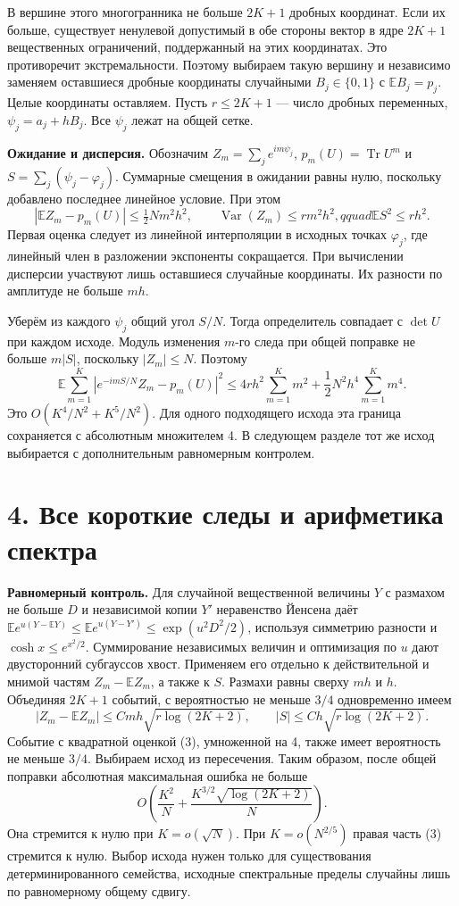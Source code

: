 \documentclass[11pt,a4paper]{article}
\newcommand{\Tr}{\operatorname{Tr}}
\newcommand{\EE}{\mathbb E}
\newcommand{\sect}[1]{\section*{\sffamily\color{ink}#1}}
\newcommand{\subt}[1]{\par\medskip\noindent\textbf{#1.}\quad}
\begin{document}
В вершине этого многогранника не больше \(2K+1\) дробных координат. Если их больше, существует ненулевой допустимый в обе стороны вектор в ядре \(2K+1\) вещественных ограничений, поддержанный на этих координатах. Это противоречит экстремальности. Поэтому выбираем такую вершину и независимо заменяем оставшиеся дробные координаты случайными \(B_j\in\{0,1\}\) с \(\EE B_j=p_j\). Целые координаты оставляем. Пусть \(r\le2K+1\) --- число дробных переменных, \(\psi_j=a_j+hB_j\). Все \(\psi_j\) лежат на общей сетке.

\subt{Ожидание и дисперсия}
Обозначим \(Z_m=\sum_j e^{im\psi_j}\), \(p_m(U)=\Tr U^m\) и \(S=\sum_j(\psi_j-\varphi_j)\). Суммарные смещения в ожидании равны нулю, поскольку добавлено последнее линейное условие. При этом
\[
  |\EE Z_m-p_m(U)|\le\tfrac12 Nm^2h^2,\qquad
  \operatorname{Var}(Z_m)\le r m^2h^2,qquad
  \EE S^2\le r h^2.
\]
Первая оценка следует из линейной интерполяции в исходных точках \(\varphi_j\), где линейный член в разложении экспоненты сокращается. При вычислении дисперсии участвуют лишь оставшиеся случайные координаты. Их разности по амплитуде не больше \(mh\).

Уберём из каждого \(\psi_j\) общий угол \(S/N\). Тогда определитель совпадает с \(\det U\) при каждом исходе. Модуль изменения \(m\)-го следа при общей поправке не больше \(m|S|\), поскольку \(|Z_m|\le N\). Поэтому
\begin{equation}
 \EE\sum_{m=1}^{K}|e^{-imS/N} Z_m-p_m(U)|^2
   \le 4 r h^2\sum_{m=1}^{K}m^2+\frac12N^2h^4\sum_{m=1}^{K}m^4 .
                                                        \tag{3}
\end{equation}
Это \(O(K^4/N^2+K^5/N^2)\). Для одного подходящего исхода эта граница сохраняется с абсолютным множителем 4. В следующем разделе тот же исход выбирается с дополнительным равномерным контролем.

\newpage
\sect{4. Все короткие следы и арифметика спектра}
\subt{Равномерный контроль}
Для случайной вещественной величины \(Y\) с размахом не больше \(D\) и независимой копии \(Y'\) неравенство Йенсена даёт \(\EE e^{u(Y-\EE Y)}\le\EE e^{u(Y-Y')}\le\exp(u^2 D^2/2)\), используя симметрию разности и \(\cosh x\le e^{x^2/2}\). Суммирование независимых величин и оптимизация по \(u\) дают двусторонний субгауссов хвост. Применяем его отдельно к действительной и мнимой частям \(Z_m-\EE Z_m\), а также к \(S\). Размахи равны сверху \(mh\) и \(h\). Объединяя \(2K+1\) событий, с вероятностью не меньше \(3/4\) одновременно имеем
\[
 |Z_m-\EE Z_m|\le C m h\sqrt{r\log(2K+2)},\qquad
 |S|\le C h\sqrt{r\log(2K+2)}.
\]
Событие с квадратной оценкой (3), умноженной на 4, также имеет вероятность не меньше \(3/4\). Выбираем исход из пересечения. Таким образом, после общей поправки абсолютная максимальная ошибка не больше
\[
              O\!\left(\frac{K^2}{N}
                         +\frac{K^{3/2}\sqrt{\log(2K+2)}}{N}\right).
\]
Она стремится к нулю при \(K=o(\sqrt N)\). При \(K=o(N^{2/5})\) правая часть (3) стремится к нулю. Выбор исхода нужен только для существования детерминированного семейства, исходные спектральные пределы случайны лишь по равномерному общему сдвигу.
\end{document}
